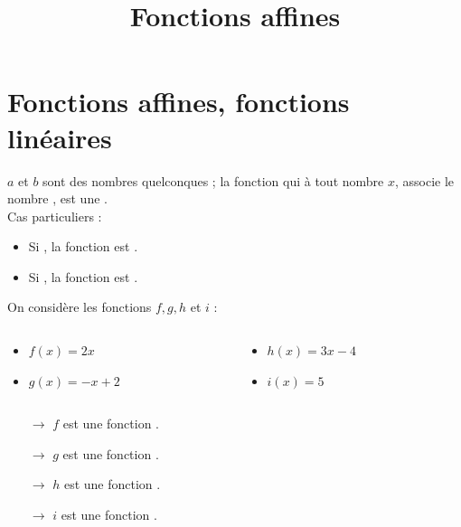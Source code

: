 \documentclass[xcolor={dvipsnames}]{beamer}
\title{Fonctions affines}
\author{}\institute{}
\begin{document}
\begin{frame}
  \titlepage 
\end{frame}

\section{Fonctions affines, fonctions linéaires}

\begin{frame}
\begin{mydefs}
	
	$a$ et $b$ sont des nombres quelconques ; la fonction qui à tout nombre $x$, associe le nombre , est une .\\
	
	
	Cas particuliers :
	\begin{itemize}
		\item Si , la fonction est .
		\item Si , la fonction est .
	\end{itemize}
\end{mydefs}
\end{frame}

\begin{frame}
	\begin{myexs}
		On considère les fonctions $f,g,h$ et $i$ :
		\begin{columns}[c]
			\begin{column}{6cm}
				\begin{itemize}
					\item $f(x)=2x$
					\item $g(x)=-x+2$
				\end{itemize}
			\end{column}
			\begin{column}{6cm}
				\begin{itemize}
					\item $h(x)=3x-4$
					\item $i(x)=5$
				\end{itemize}
			\end{column}				
		\end{columns}
		
		\vspace*{1cm}
		
		\begin{itemize}
			\item[$\rightarrow$] $f$ est une fonction .
			\item[$\rightarrow$] $g$ est une fonction .
			\item[$\rightarrow$] $h$ est une fonction .
			\item[$\rightarrow$] $i$ est une fonction .
		\end{itemize}
	\end{myexs}
\end{frame}
\end{document}
